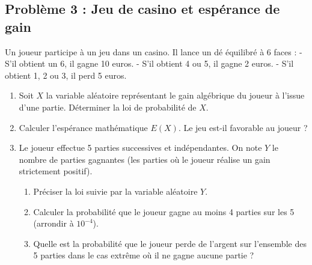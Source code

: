 \subsection*{Problème 3 : Jeu de casino et espérance de gain}
Un joueur participe à un jeu dans un casino. Il lance un dé équilibré à 6 faces :
- S'il obtient un 6, il gagne 10 euros.
- S'il obtient 4 ou 5, il gagne 2 euros.
- S'il obtient 1, 2 ou 3, il perd 5 euros.
\begin{enumerate}
    \item Soit $X$ la variable aléatoire représentant le gain algébrique du joueur à l'issue d'une partie. Déterminer la loi de probabilité de $X$.
    \item Calculer l'espérance mathématique $E(X)$. Le jeu est-il favorable au joueur ?
    \item Le joueur effectue 5 parties successives et indépendantes. On note $Y$ le nombre de parties gagnantes (les parties où le joueur réalise un gain strictement positif).
    \begin{enumerate}
        \item Préciser la loi suivie par la variable aléatoire $Y$.
        \item Calculer la probabilité que le joueur gagne au moins 4 parties sur les 5 (arrondir à $10^{-4}$).
        \item Quelle est la probabilité que le joueur perde de l'argent sur l'ensemble des 5 parties dans le cas extrême où il ne gagne aucune partie ?
    \end{enumerate}
\end{enumerate}

